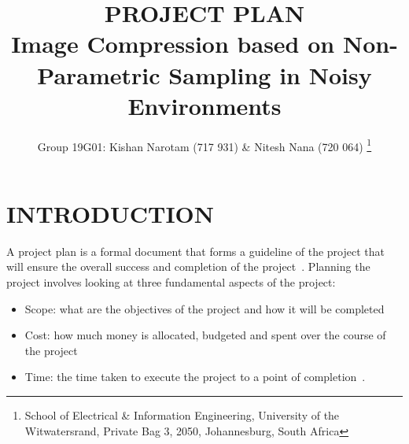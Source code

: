 \documentclass[10pt,twocolumn]{witseiepaper}
\begin{document}

\title{PROJECT PLAN\\ Image Compression based on Non-Parametric Sampling in Noisy Environments}

\author{Group 19G01: Kishan Narotam (717 931) \& Nitesh Nana (720 064)
\thanks{School of Electrical \& Information Engineering, University of the
Witwatersrand, Private Bag 3, 2050, Johannesburg, South Africa}
}





\maketitle
\thispagestyle{empty}\pagestyle{empty}


\section{INTRODUCTION}
\label{sec: Introduction}
A project plan is a formal document that forms a guideline of the project that will ensure the overall success and completion of the project~\cite{Techopedia}. Planning the project involves looking at three fundamental aspects of the project:
\begin{itemize}
\item Scope: what are the objectives of the project and how it will be completed
\item Cost: how much money is allocated, budgeted and spent over the course of the project
\item Time: the time taken to execute the project to a point of completion~\cite{PM}.
\end{itemize}
\end{document}
